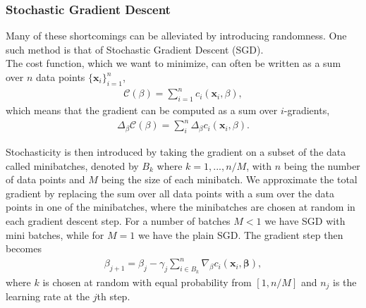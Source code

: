 \documentclass[english,notitlepage,reprint,nofootinbib]{revtex4-2}  %
\begin{document}
\subsubsection*{Stochastic Gradient Descent}%
Many of these shortcomings can be alleviated by introducing randomness. One such method is that of Stochastic Gradient Descent (SGD). 
\vspace{3mm}
\\ 
The cost function, which we want to minimize, can often be written as a sum over $n$ data points $\{\boldsymbol{x}_i\}^n_{i=1}$, 
\begin{align}
    \mathcal{C}(\beta) = \sum\limits_{i=1}^n c_i (\boldsymbol{x}_i, \beta), \nonumber 
\end{align}
which means that the gradient can be computed as a sum over $i$-gradients, 
\begin{align}\label{eq: costfunc_SGD}
    \Delta_\beta \mathcal{C}(\beta) = \sum\limits_{i}^n \Delta_\beta c_i  (\boldsymbol{x}_i, \beta). 
\end{align}

Stochasticity is then introduced by taking the gradient on a subset of the data called minibatches, denoted by $B_k$ where $k=1, ..., n/M$, with $n$ being the number of data points and $M$ being the size of each minibatch. We approximate the total gradient by replacing the sum over all data points with a sum over the data points in one of the minibatches, 
where the minibatches are chosen at random in each gradient descent step. For a number of batches $M<1$ we have SGD with mini batches, while for $M=1$ we have the plain SGD. 
The gradient step then becomes 
\begin{align}
    \beta_{j+1} 
    = \beta_j - \gamma_j \sum_{i \in B_k}^n \nabla_\beta c_i(\mathbf{x}_i,
    \mathbf{\beta}),  \nonumber
\end{align}
where $k$ is chosen at random with equal probability from $[1, n/M]$ and $n_j$ is the learning rate at the $j$th step. 

\end{document}
